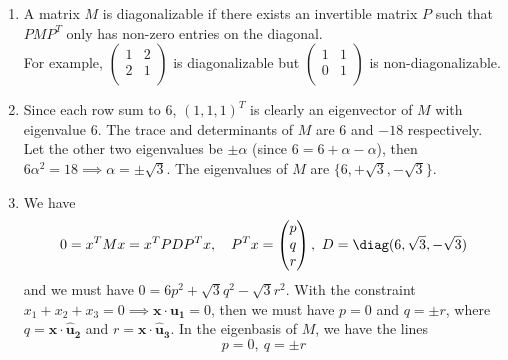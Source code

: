 \documentclass[a4paper]{article}
\begin{document}
\begin{ans}\leavevmode
\begin{enumerate}[label=(\alph*)]
\item A matrix $M$ is diagonalizable if there exists an invertible matrix $P$ such that $PMP^T$ only has non-zero entries on the diagonal.\\[5pt]
For example, $\begin{pmatrix}1&2\\2&1\\\end{pmatrix}$ is diagonalizable but $\begin{pmatrix}1&1\\0&1\\\end{pmatrix}$ is non-diagonalizable.
\item Since each row sum to 6, $(1,1,1)^T$ is clearly an eigenvector of $M$ with eigenvalue 6. The trace and determinants of $M$ are 6 and $-18$ respectively. Let the other two eigenvalues be $\pm\alpha$ (since $6=6+\alpha-\alpha$), then $6\alpha^2=18\implies\alpha=\pm\sqrt{3}$. The eigenvalues of $M$ are $\{6,+\sqrt{3},-\sqrt{3}\}$.
\item We have 
$$0=x^TMx=x^TPDP^Tx,\quad P^Tx=\begin{pmatrix}p\\q\\r\\\end{pmatrix},~D=\diag(6,\sqrt{3},-\sqrt{3})$$
and we must have $0=6p^2+\sqrt{3}q^2-\sqrt{3}r^2$. With the constraint $x_1+x_2+x_3=0\implies\mathbf{x}\cdot\mathbf{u_1}=0$, then we must have $p=0$ and $q=\pm r$, where $q=\mathbf{x}\cdot\mathbf{\hat{u}_2}$ and $r=\mathbf{x}\cdot\mathbf{\hat{u}_3}$. In the eigenbasis of $M$, we have the lines 
$$p=0,~q=\pm r$$
\end{enumerate}
\end{ans}
\newpage
\end{document}
